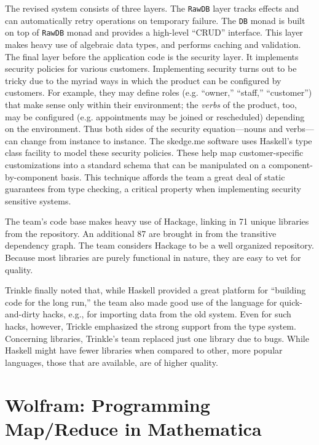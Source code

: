 \documentclass{jfp1}
\begin{document}
The revised system consists of three layers. The \texttt{RawDB} layer
tracks effects and can automatically retry operations on temporary failure.
The \texttt{DB} monad is built on top of \texttt{RawDB} monad and provides
a high-level ``CRUD'' interface. This layer makes heavy use of algebraic
data types, and performs caching and validation. The final layer before the
application code is the security layer. It implements security policies for
various customers. Implementing security turns out to be tricky due to the
myriad ways in which the product can be configured by customers. For
example, they may define roles (e.g. ``owner,'' ``staff,'' ``customer'')
that make sense only within their environment; the \textit{verbs} of the
product, too, may be configured (e.g. appointments may be joined or
rescheduled) depending on the environment. Thus both sides of the security
equation---nouns and verbs---can change from instance to instance.  The
skedge.me software uses Haskell's type class facility to model these security
policies. These help map customer-specific customizations into a standard
schema that can be manipulated on a component-by-component basis. This
technique affords the team a great deal of static guarantees from type
checking, a critical property when implementing security sensitive systems.

The team's code base makes heavy use of Hackage, linking in 71 unique
libraries from the repository. An additional 87 are brought in from the
transitive dependency graph. The team considers Hackage to be a well
organized repository. Because most libraries are purely functional in
nature, they are easy to vet for quality. 

Trinkle finally noted that, while Haskell provided a great platform for
``building code for the long run,'' the team also made good use of the
language for quick-and-dirty hacks, e.g., for importing data from the old
system. Even for such hacks, however, Trickle emphasized the strong support
from the type system. Concerning libraries, Trinkle's team replaced just
one library due to bugs. While Haskell might have fewer libraries when
compared to other, more popular languages, those that are available, are of
higher quality.

\section{Wolfram: Programming Map/Reduce in Mathematica}
\end{document}

